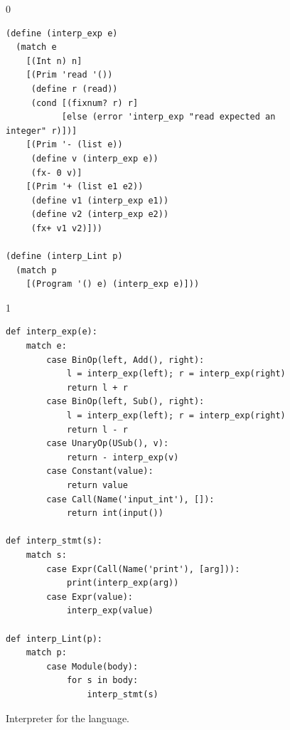 \documentclass[7x10,nocrop]{TimesAPriori_MIT}%
\def\racketEd{0}
\def\pythonEd{1}
\def\edition{1}
\begin{document}
\begin{figure}[tp]
{\if\edition\racketEd
\begin{lstlisting}
(define (interp_exp e)
  (match e
    [(Int n) n]
    [(Prim 'read '())
     (define r (read))
     (cond [(fixnum? r) r]
           [else (error 'interp_exp "read expected an integer" r)])]
    [(Prim '- (list e))
     (define v (interp_exp e))
     (fx- 0 v)]
    [(Prim '+ (list e1 e2))
     (define v1 (interp_exp e1))
     (define v2 (interp_exp e2))
     (fx+ v1 v2)]))

(define (interp_Lint p)
  (match p
    [(Program '() e) (interp_exp e)]))
\end{lstlisting}
\fi}
{\if\edition\pythonEd
\begin{lstlisting}
def interp_exp(e):
    match e:
        case BinOp(left, Add(), right):
            l = interp_exp(left); r = interp_exp(right)
            return l + r
        case BinOp(left, Sub(), right):
            l = interp_exp(left); r = interp_exp(right)
            return l - r
        case UnaryOp(USub(), v):
            return - interp_exp(v)
        case Constant(value):
            return value
        case Call(Name('input_int'), []):
            return int(input())            

def interp_stmt(s):
    match s:
        case Expr(Call(Name('print'), [arg])):
            print(interp_exp(arg))
        case Expr(value):
            interp_exp(value)

def interp_Lint(p):
    match p:
        case Module(body):
            for s in body:
                interp_stmt(s)
\end{lstlisting}
\fi}
\caption{Interpreter for the \LangInt{} language.}
\label{fig:interp_Lint}
\end{figure}
\end{document}
